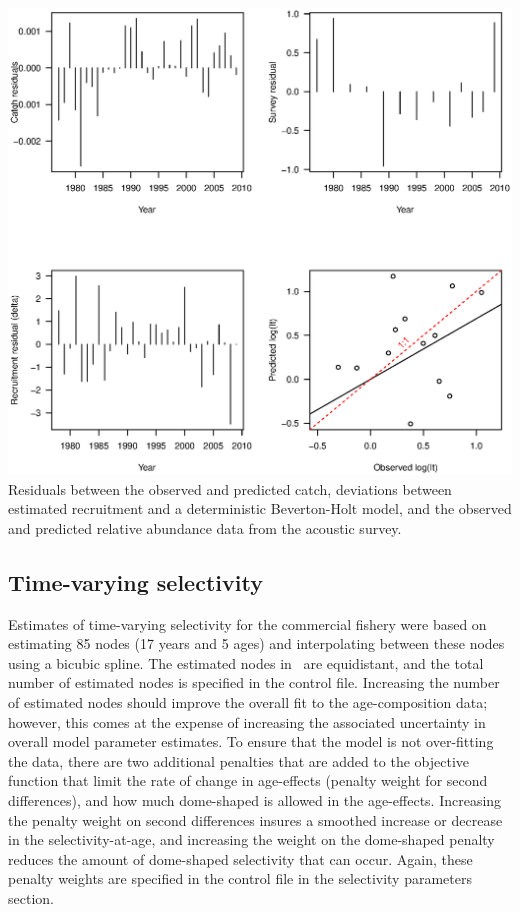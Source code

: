 \begin{multicols}{2}
\begin{figurehere}
	\centering
	\includegraphics[width=0.95\columnwidth]{iscamFigs/phakefig11.eps}\\
	\caption{Residuals between the observed and predicted catch, deviations between estimated recruitment and a deterministic Beverton-Holt model, and the observed and predicted relative abundance data from the acoustic survey.}\label{fig12}
\end{figurehere}


\subsection{Time-varying selectivity}
Estimates of time-varying selectivity for the commercial fishery were based on estimating 85 nodes (17 years and 5 ages) and interpolating between these nodes using a bicubic spline.  The estimated nodes in \iscam\ are equidistant, and the total number of estimated nodes is specified in the control file.  Increasing the number of estimated nodes should improve the overall fit to the age-composition data; however, this comes at the expense of increasing the associated uncertainty in overall model parameter estimates.  To ensure that the model is not over-fitting the data, there are two additional penalties that are added to the objective function that limit the rate of change in age-effects (penalty weight for second differences), and how much dome-shaped is allowed in the age-effects.  Increasing the penalty weight on second differences insures a smoothed increase or decrease in the selectivity-at-age, and increasing the weight on the dome-shaped penalty reduces the amount of dome-shaped selectivity that can occur.  Again, these penalty weights are specified in the control file  in the selectivity parameters section.


\end{multicols}
